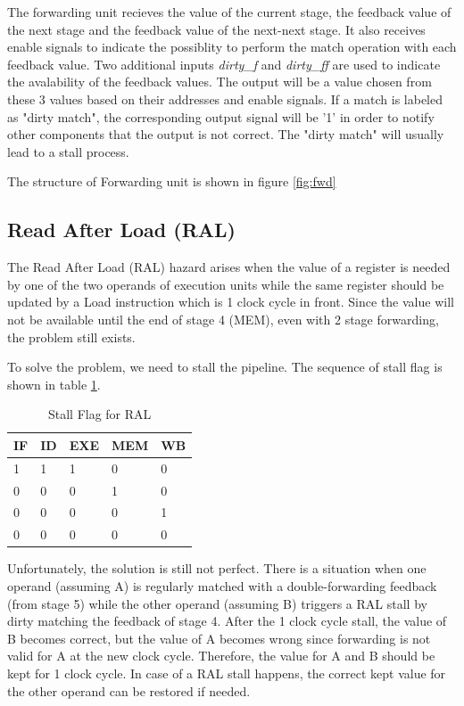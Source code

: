 The forwarding unit recieves the value of the current stage, the feedback value
of the next stage and the feedback value of the next-next stage. It also receives
enable signals to indicate the possiblity to perform the match operation with each
feedback value. Two additional inputs {\it dirty\_f} and {\it dirty\_ff} are used to
indicate the avalability of the feedback values. The output will be a value chosen from these
3 values based on their addresses and enable signals. If a match is labeled as
"dirty match", the corresponding output signal will be '1' in order to notify other
components that the output is not correct. The "dirty match" will usually lead to
a stall process.

The structure of Forwarding unit is shown in figure \ref{fig:fwd}

\subsection[Read After Load (RAL)]{Read After Load (RAL)}
The Read After Load (RAL) hazard arises when the value of a register is needed by
one of the two operands of execution units while the same register should be
updated by a Load instruction which is 1 clock cycle
in front. Since the value will not be available until the end of stage 4 (MEM), even
with 2 stage forwarding, the problem still exists.

To solve the problem, we need to stall the pipeline. The sequence of stall flag
is shown in table \ref{tab:stall_ral}.

\begin{table}[!ht]
\centering
\caption{Stall Flag for RAL}
\label{tab:stall_ral}
\begin{tabular}{|l|l|l|l|l|}
\hline
IF & ID & EXE & MEM & WB \\
\hline
1  & 1  & 1  & 0  & 0\\
0  & 0  & 0  & 1  & 0\\
0  & 0  & 0  & 0  & 1\\
0  & 0  & 0  & 0  & 0 \\
\hline
\end{tabular}
\end{table}

Unfortunately, the solution is still not perfect. There is a situation when one
operand (assuming A) is regularly matched with a double-forwarding feedback (from
stage 5) while the other operand (assuming B) triggers a RAL stall by dirty matching
the feedback of stage 4. After the 1 clock cycle stall, the value of B becomes correct,
but the value of A becomes wrong since forwarding is not valid for A at the new clock cycle.
Therefore, the value for A and B should be kept for 1 clock cycle. In case of a RAL stall happens, the correct
kept value for the other operand can be restored if needed.

